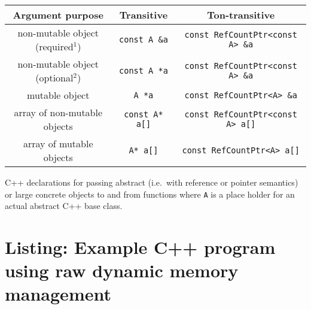 \documentclass[pdf,ps2pdf,11pt]{SANDreport}
\begin{document}
\begin{center}
\begin{minipage}{{}\textwidth}
\begin{tabular}{|c|c|c|}
\hline
Argument purpose
& Transitive
& Ton-transitive \\
\hline
\hline
non-mutable object (required$^1$)
& {}\texttt{const A \&a}
& {}\texttt{const RefCountPtr<const A> \&a} \\
\hline
non-mutable object (optional$^2$)
& {}\texttt{const A *a}
& {}\texttt{const RefCountPtr<const A> \&a} \\
\hline
mutable object
& {}\texttt{A *a}
& {}\texttt{const RefCountPtr<A> \&a} \\
\hline
array of non-mutable objects
& {}\texttt{const A* a[]}
& {}\texttt{const RefCountPtr<const A> a[]} \\
\hline
array of mutable objects
& {}\texttt{A* a[]}
& {}\texttt{const RefCountPtr<A> a[]} \\
\hline
\end{tabular}
\begin{center}
C++ declarations for passing abstract (i.e.~with reference or pointer
semantics) or large concrete objects to and from functions where
{}\texttt{A} is a place holder for an actual abstract C++ base class.
\end{center}
\end{minipage}
\end{center}

%
\section{Listing: Example C++ program using raw dynamic memory management}
\label{rcpqs:apdx:ex-prg}
%
\end{document}
